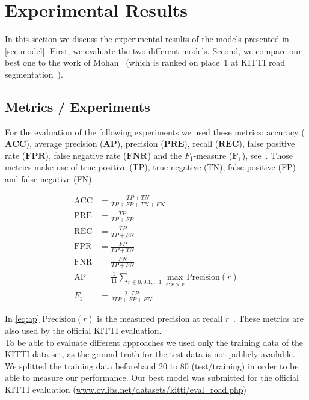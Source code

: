 
\section{Experimental Results}\label{sec:evaluation}

In this section we discuss the experimental results of the models
presented in \cref{sec:model}. First, we evaluate the two different
models. Second, we compare our best one to the work of
Mohan~\cite{Tarel2009} (which is ranked on place~1 at KITTI road
segmentation~\cite{Tarel2009}).


\subsection{Metrics / Experiments}



For the evaluation of the following experiments we used these metrics:
accuracy ($\mathbf{ACC}$), average precision ($\mathbf{AP}$), precision ($\mathbf{PRE}$),  recall ($\mathbf{REC}$), false positive rate ($\mathbf{FPR}$),  false negative rate ($\mathbf{FNR}$)
and the $F_1$-measure ($\mathbf{F_1}$), see~.
Those metrics make use of true positive (TP), true negative (TN), false positive (FP) and false negative (FN).

\begin{align}\label{eq:accuracy}
\text{ACC} &= \frac{TP + TN}{TP + FP + TN + FN}\\
\text{PRE} &= \frac{TP}{TP + FP}\label{eq:precision}\\
\text{REC} &= \frac{TP}{TP + FN}\label{eq:recall}\\
\text{FPR} &= \frac{FP}{FP + TN}\label{eq:fpr}\\
\text{FNR} &= \frac{FN}{TP+ FN}\label{eq:fnr}\\
\text{AP} &= \frac{1}{11} \displaystyle\sum_{r \in 0,0.1,\dots 1} \max_{\tilde{r}: \tilde{r} > r} \text{Precision}(\tilde{r})\label{eq:ap}\\
F_1 &= \frac{2 \cdot TP}{2TP +FP +FN}\label{eq:fMeasure}
\end{align}

%
In \cref{eq:ap}  $\text{Precision}(\tilde{r})$ is the measured precision at recall $\tilde{r}$~\cite{everingham2010pascal}. These metrics are also used by the official KITTI evaluation. \\
To be able to evaluate different approaches we used only the
training data of the KITTI data set, as the ground truth for the test data is
not publicly available. We splitted the training data beforehand 20 to 80
(test/training) in order to be able to measure our performance. Our best model
was submitted for the official KITTI evaluation
(\href{http://www.cvlibs.net/datasets/kitti/eval_road.php}{www.cvlibs.net/datasets/kitti/eval\_road.php})\\

